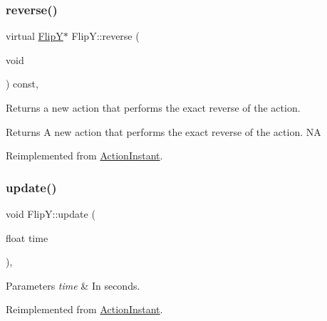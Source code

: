 \subsubsection{\texorpdfstring{reverse()}{reverse()}\hspace{0.1cm}{\footnotesize\ttfamily [2/2]}}
{\footnotesize\ttfamily virtual \hyperlink{classFlipY}{FlipY}$\ast$ Flip\+Y\+::reverse (\begin{DoxyParamCaption}\item[{void}]{ }\end{DoxyParamCaption}) const\hspace{0.3cm}{\ttfamily [override]}, {\ttfamily [virtual]}}

Returns a new action that performs the exact reverse of the action.

\begin{DoxyReturn}{Returns}
A new action that performs the exact reverse of the action.  NA 
\end{DoxyReturn}


Reimplemented from \hyperlink{classActionInstant_aeb1870802c509e1f4111c863a28e9262}{Action\+Instant}.

\mbox{\label{classFlipY_a75442be63f171b641a1f98165e915439}} 
\subsubsection{\texorpdfstring{update()}{update()}\hspace{0.1cm}{\footnotesize\ttfamily [1/2]}}
{\footnotesize\ttfamily void Flip\+Y\+::update (\begin{DoxyParamCaption}\item[{float}]{time }\end{DoxyParamCaption})\hspace{0.3cm}{\ttfamily [override]}, {\ttfamily [virtual]}}


\begin{DoxyParams}{Parameters}
{\em time} & In seconds. \\
\hline
\end{DoxyParams}


Reimplemented from \hyperlink{classActionInstant_a59875bf08cd1f58c0c8c6693ac540ade}{Action\+Instant}.

\mbox{\label{classFlipY_a51936fab0a0dc692e381a8a89c3d8e43}} 
